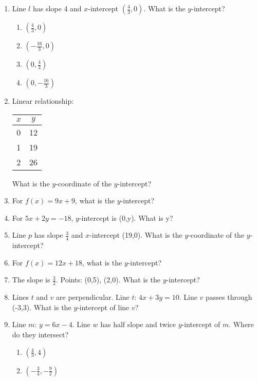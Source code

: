 \documentclass[12pt]{exam}
\begin{document}
\begin{enumerate}
\begin{enumerate}[label=\Alph*)]
    \end{enumerate}
    \item Line $l$ has slope 4 and $x$-intercept $(\frac{4}{3}, 0)$. What is the $y$-intercept?
    \begin{enumerate}[label=\Alph*)]
        \item $(\frac{4}{3}, 0)$
        \item $(-\frac{16}{3}, 0)$
        \item $(0, \frac{4}{3})$
        \item $(0, -\frac{16}{3})$
    \end{enumerate}
    \item Linear relationship:
    \begin{center}
        \begin{tabular}{|c|c|}
            \hline
            $x$ & $y$ \\
            \hline
            0 & 12 \\
            1 & 19 \\
            2 & 26 \\
            \hline
        \end{tabular}
    \end{center}
    What is the $y$-coordinate of the $y$-intercept?
    \item For $f(x) = 9x + 9$, what is the $y$-intercept?
    \item For $5x + 2y = -18$, $y$-intercept is (0,y). What is y?
    \item Line $p$ has slope $\frac{3}{4}$ and $x$-intercept (19,0). What is the $y$-coordinate of the $y$-intercept?
    \item For $f(x) = 12x + 18$, what is the $y$-intercept?
    \item The slope is $\frac{3}{2}$. Points: (0,5), (2,0). What is the $y$-intercept?
    \item Lines $t$ and $v$ are perpendicular. Line $t$: $4x + 3y = 10$. Line $v$ passes through (-3,3). What is the $y$-intercept of line $v$?
    \item Line $m$: $y = 6x - 4$. Line $w$ has half slope and twice $y$-intercept of $m$. Where do they intersect?
    \begin{enumerate}[label=\Alph*)]
        \item $\left( \frac{4}{3}, 4 \right)$
        \item $\left( -\frac{3}{4}, -\frac{9}{2} \right)$

\end{enumerate}
\end{enumerate}
\end{document}

